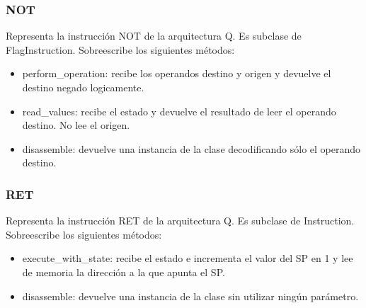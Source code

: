 \subsubsection{NOT}
Representa la instrucción NOT de la arquitectura Q. Es subclase de FlagInstruction. Sobreescribe los siguientes métodos:
\begin{itemize}
\item perform\_operation: recibe los operandos destino y origen y devuelve el destino negado logicamente.
\item read\_values: recibe el estado y devuelve el resultado de leer el operando destino. No lee el origen.
\item disassemble: devuelve una instancia de la clase decodificando sólo el operando destino.
\end{itemize}

\subsubsection{RET}
Representa la instrucción RET de la arquitectura Q. Es subclase de Instruction. Sobreescribe los siguientes métodos:
\begin{itemize}
\item execute\_with\_state: recibe el estado e incrementa el valor del SP en 1 y lee de memoria la dirección a la que apunta el SP.
\item disassemble: devuelve una instancia de la clase sin utilizar ningún parámetro.
\end{itemize}
